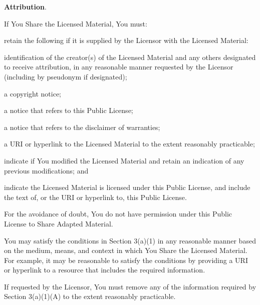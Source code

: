 \begin{doclicense@enumerate}
\item \par \textbf{Attribution}.
\begin{doclicense@enumerate}
\item \par If You Share the Licensed Material, You must:
\begin{doclicense@enumerate}
\item retain the following if it is supplied by the Licensor with the Licensed Material:
\begin{doclicense@enumerate}
\item identification of the creator(s) of the Licensed Material and any others designated to receive attribution, in any reasonable manner requested by the Licensor (including by pseudonym if designated);
\item a copyright notice;
\item a notice that refers to this Public License; 
\item a notice that refers to the disclaimer of warranties;
\item a URI or hyperlink to the Licensed Material to the extent reasonably practicable;
\end{doclicense@enumerate}
\item indicate if You modified the Licensed Material and retain an indication of any previous modifications; and
\item indicate the Licensed Material is licensed under this Public License,
and include the text of, or the URI or hyperlink to, this Public
License.
\end{doclicense@enumerate}
For the avoidance of doubt, You do not have permission under this Public License to Share Adapted Material.

\item You may satisfy the conditions in Section 3(a)(1) in any reasonable manner based on the medium, means, and context in which You Share the Licensed Material. For example, it may be reasonable to satisfy the conditions by providing a URI or hyperlink to a resource that includes the required information.
\item If requested by the Licensor, You must remove any of the information required by Section 3(a)(1)(A) to the extent reasonably practicable.
\end{doclicense@enumerate}

\end{doclicense@enumerate}
